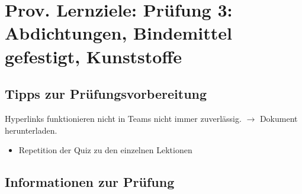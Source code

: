 



\newcommand{\blattname}{Prov. Lernziele: Prüfung 3: Abdichtungen, Bindemittel gefestigt, Kunststoffe}
\newcommand{\Added}[1]{\textcolor{blue}{#1}}



\section*{\blattname}
\subsection*{Tipps zur Prüfungsvorbereitung}
Hyperlinks funktionieren nicht in Teams nicht immer zuverlässig. $\rightarrow$ Dokument herunterladen.
\begin{itemize}
	\item Repetition der Quiz zu den einzelnen Lektionen

\end{itemize}

\subsection*{Informationen zur Prüfung}

